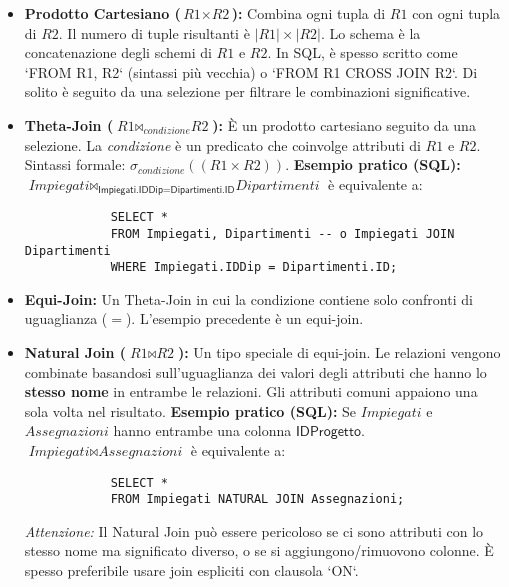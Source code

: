 \documentclass{article}
\newcommand{\Rel}[1]{\textit{#1}} %
\newcommand{\Attr}[1]{\textsf{#1}} %
\newcommand{\myselectop}[2]{\sigma_{#1}(#2)}
\newcommand{\mycartesian}{\times}
\newcommand{\mynaturaljoin}{\bowtie} %
\newcommand{\mythetajoin}[3]{#1 \bowtie_{#2} #3} %
\begin{document}
	\begin{itemize}
		\item \textbf{Prodotto Cartesiano ($\Rel{R1} \mycartesian \Rel{R2}$):}
		Combina ogni tupla di $\Rel{R1}$ con ogni tupla di $\Rel{R2}$. Il numero di tuple risultanti è $|\Rel{R1}| \times |\Rel{R2}|$. Lo schema è la concatenazione degli schemi di $\Rel{R1}$ e $\Rel{R2}$.
		In SQL, è spesso scritto come `FROM R1, R2` (sintassi più vecchia) o `FROM R1 CROSS JOIN R2`. Di solito è seguito da una selezione per filtrare le combinazioni significative.
		
		\item \textbf{Theta-Join ($\mythetajoin{\Rel{R1}}{condizione}{\Rel{R2}}$):}
		È un prodotto cartesiano seguito da una selezione. La \textit{condizione} è un predicato che coinvolge attributi di $\Rel{R1}$ e $\Rel{R2}$.
		Sintassi formale: $\myselectop{condizione}{(\Rel{R1} \mycartesian \Rel{R2})}$.
		\textbf{Esempio pratico (SQL):}
		$\mythetajoin{\Rel{Impiegati}}{\Attr{Impiegati.IDDip} = \Attr{Dipartimenti.ID}}{\Rel{Dipartimenti}}$
		è equivalente a:
		\begin{verbatim}
			SELECT *
			FROM Impiegati, Dipartimenti -- o Impiegati JOIN Dipartimenti
			WHERE Impiegati.IDDip = Dipartimenti.ID;
		\end{verbatim}
		
		\item \textbf{Equi-Join:} Un Theta-Join in cui la condizione contiene solo confronti di uguaglianza ($=$). L'esempio precedente è un equi-join.
		
		\item \textbf{Natural Join ($\Rel{R1} \mynaturaljoin \Rel{R2}$):}
		Un tipo speciale di equi-join. Le relazioni vengono combinate basandosi sull'uguaglianza dei valori degli attributi che hanno lo \textbf{stesso nome} in entrambe le relazioni. Gli attributi comuni appaiono una sola volta nel risultato.
		\textbf{Esempio pratico (SQL):} Se $\Rel{Impiegati}$ e $\Rel{Assegnazioni}$ hanno entrambe una colonna $\Attr{IDProgetto}$.
		$\Rel{Impiegati} \mynaturaljoin \Rel{Assegnazioni}$
		è equivalente a:
		\begin{verbatim}
			SELECT *
			FROM Impiegati NATURAL JOIN Assegnazioni;
		\end{verbatim}
		\textit{Attenzione:} Il Natural Join può essere pericoloso se ci sono attributi con lo stesso nome ma significato diverso, o se si aggiungono/rimuovono colonne. È spesso preferibile usare join espliciti con clausola `ON`.
	\end{itemize}
	
\end{document}
